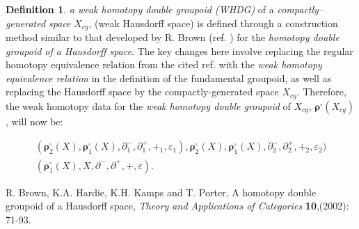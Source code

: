 \documentclass[12pt]{article}
\theoremstyle{plain}
\theoremstyle{definition}
\newtheorem{definition}{Definition}[section]
\numberwithin{equation}{section}
\begin{document}
\begin{definition} 
\emph{a weak homotopy double groupoid (WHDG)} of a 
\emph{compactly--generated space} $X _{cg}$, (weak Hausdorff space) is 
defined through a construction method similar to that developed by R. Brown (ref. \cite{BHKP}) for the \emph{homotopy double groupoid of a Hausdorff space}. The key changes here involve replacing the regular homotopy equivalence relation from the cited ref. with the \emph{weak homotopy equivalence relation} in the definition of the fundamental groupoid, as well as replacing the Hausdorff space by the compactly-generated space $X_{cg}$. Therefore, the weak homotopy data for the \emph{weak homotopy double groupoid} of $X_{cg}$, $\boldsymbol{\rho}^{\square} (X_{cg})$, will now be: \\
\end{definition} 

\[
\begin{array}{c}
(\boldsymbol{\rho}^{\square}_2 (X), \boldsymbol{\rho}_1^{\square} (X) ,
\partial^{-}_{1} , \partial^{+}_{1} , +_{1} , \varepsilon _{1}) ,
\boldsymbol{\rho}^{\square}_2 (X), \boldsymbol{\rho}^{\square}_1 (X) ,
\partial^{-}_{2} , \partial^{+}_{2} , +_{2} , \varepsilon _{2})\\[3mm]
(\boldsymbol{\rho}^{\square}_1 (X) , X , \partial^{-} , \partial^{+} , + , \varepsilon).
\end{array}\]


\begin{thebibliography}{9}

R. Brown, K.A. Hardie, K.H. Kamps  and T. Porter, A homotopy double groupoid of a Hausdorff 
space, {\it Theory and Applications of Categories} \textbf{10},(2002): 71-93.

\end{thebibliography}
\end{document}
